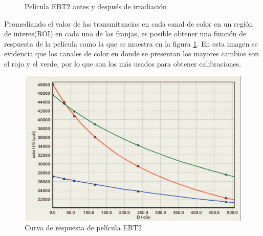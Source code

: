 \begin{figure}[H]
	\centering
	\hfill
	\caption{Película EBT2 antes y después de irradiación}
\end{figure}

Promediando el valor de las transmitancias en cada canal de color en un región de interes(ROI) en cada una de las franjas, es posible obtener una función de respuesta de la película como la que se muestra en la figura \ref{fig:curvaRespuesta}. En esta imagen se evidencia que los canales de color en donde se presentan los mayores cambios son el rojo y el verde, por lo que son los más usados para obtener calibraciones.\\

\begin{figure}[H]
	\centering
	\includegraphics[width=0.5\linewidth]{images/respses.png}
	\caption{Curva de respuesta de película EBT2\cite{manualEBT2}}
	\label{fig:curvaRespuesta}
\end{figure}

